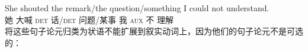 \ea
\gll She shouted the remark/the question/something I could not understand.\\
她 大喊 \textsc{det} 话/\textsc{det} 问题/某事 我 \textsc{aux} 不 理解\\
\z
将这些句子论元归类为状语不能扩展到叙实动词上，因为他们的句子论元不是可选的\citep[]{AG2008a}：

\eal
{}
\zl

